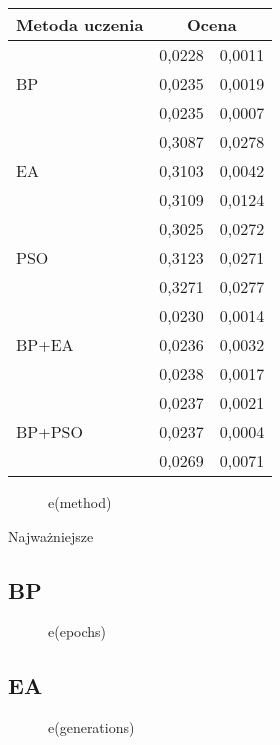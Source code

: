 \documentclass[11pt,a4paper,oneside]{report}
\begin{document}
\begin{table}[H]
	\caption{name me}
	\centering 
	\begin{longtable}{|l|r@{$\pm$}r|}
		\hline
		Metoda uczenia & \multicolumn{2}{|c|}{Ocena} \\
		\hline \hline
		\multirow{3}{*}{BP} & 0,0228 & 0,0011 \\ 
		 & 0,0235 & 0,0019 \\ 
		 & 0,0235 & 0,0007 \\ \hline
		\multirow{3}{*}{EA} & 0,3087 & 0,0278 \\ 
		 & 0,3103 & 0,0042 \\ 
		 & 0,3109 & 0,0124 \\ \hline
		\multirow{3}{*}{PSO} & 0,3025 & 0,0272 \\ 
		 & 0,3123 & 0,0271 \\ 
		 & 0,3271 & 0,0277 \\ \hline
		\multirow{3}{*}{BP+EA} & 0,0230 & 0,0014 \\
		 & 0,0236 & 0,0032 \\
		 & 0,0238 & 0,0017 \\ \hline
		\multirow{3}{*}{BP+PSO} & 0,0237 & 0,0021 \\
		 & 0,0237 & 0,0004 \\
		 & 0,0269 & 0,0071 \\ \hline
	\end{longtable}
\end{table}

\begin{figure}[H]
	\caption{e(method)}
	
\end{figure}

Najważniejsze

\subsection{BP}

\begin{figure}[H]
	\caption{e(epochs)}
	
\end{figure}

\subsection{EA}

\begin{figure}[H]
	\caption{e(generations)}
	
\end{figure}
\end{document}
